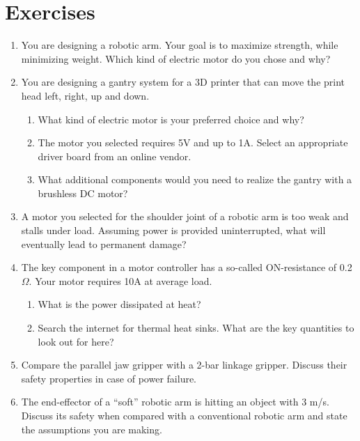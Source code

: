 \section*{Exercises}\small
\begin{enumerate}
\item You are designing a robotic arm. Your goal is to maximize strength, while minimizing weight. Which kind of electric motor do you chose and why?
\item You are designing a gantry system for a 3D printer that can move the print head left, right, up and down.
\begin{enumerate}
\item What kind of electric motor is your preferred choice and why?
\item The motor you selected requires 5V and up to 1A. Select an appropriate driver board from an online vendor.
\item What additional components would you need to realize the gantry with a brushless DC motor?
\end{enumerate}
\item A motor you selected for the shoulder joint of a robotic arm is too weak and stalls under load. Assuming power is provided uninterrupted, what will eventually lead to permanent damage?
\item The key component in a motor controller has a so-called ON-resistance of 0.2$\Omega$. Your motor requires 10A at average load.
\begin{enumerate}
\item What is the power dissipated at heat?
\item Search the internet for thermal heat sinks. What are the key quantities to look out for here?
\end{enumerate}
\item Compare the parallel jaw gripper with a 2-bar linkage gripper. Discuss their safety properties in case of power failure.
\item The end-effector of a ``soft'' robotic arm is hitting an object with 3 m/s. Discuss its safety when compared with a conventional robotic arm and state the assumptions you are making. 
\end{enumerate}\normalsize
